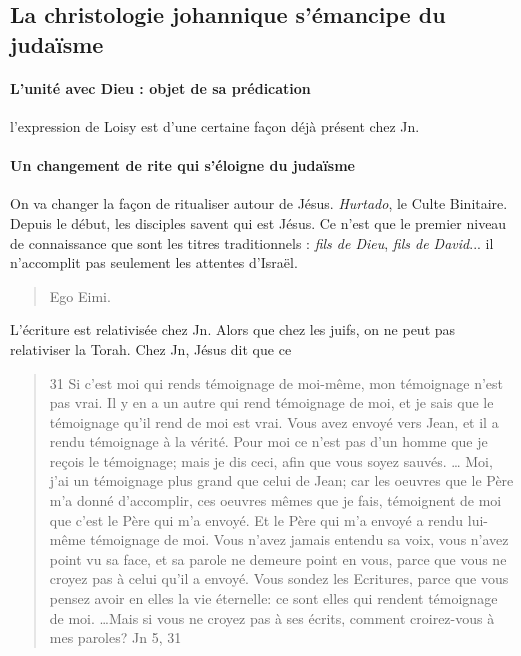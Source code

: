    
     
    \subsection{La christologie johannique s'émancipe du judaïsme}
     
        \paragraph{L'unité avec Dieu : objet de sa prédication} l'expression de Loisy est d'une certaine façon déjà présent chez Jn.
    \paragraph{Un changement de rite qui s'éloigne du judaïsme} On va changer la façon de ritualiser autour de Jésus. \textit{Hurtado}, le Culte Binitaire.
    Depuis le début, les disciples savent qui est Jésus. Ce n'est que le premier niveau de connaissance que sont les titres traditionnels : \textit{fils de Dieu}, \textit{fils de David}... il n'accomplit pas seulement les attentes d'Israël.
 
\begin{quote}
    Ego Eimi.
\end{quote}
L'écriture est relativisée chez Jn. Alors que chez les juifs, on ne peut pas relativiser la Torah.
Chez Jn, Jésus dit que ce 
\begin{quote}
31 Si c'est moi qui rends témoignage de moi-même, mon témoignage n'est pas vrai. Il y en a un autre qui rend témoignage de moi, et je sais que le témoignage qu'il rend de moi est vrai.
Vous avez envoyé vers Jean, et il a rendu témoignage à la vérité. Pour moi ce n'est pas d'un homme que je reçois le témoignage; mais je dis ceci, afin que vous soyez sauvés. \ldots
Moi, j'ai un témoignage plus grand que celui de Jean; car les oeuvres que le Père m'a donné d'accomplir, ces oeuvres mêmes que je fais, témoignent de moi que c'est le Père qui m'a envoyé.
Et le Père qui m'a envoyé a rendu lui-même témoignage de moi. Vous n'avez jamais entendu sa voix, vous n'avez point vu sa face, et sa parole ne demeure point en vous, parce que vous ne croyez pas à celui qu'il a envoyé.
Vous sondez les Ecritures, parce que vous pensez avoir en elles la vie éternelle: ce sont elles qui rendent témoignage de moi. \ldots Mais si vous ne croyez pas à ses écrits, comment croirez-vous à mes paroles?
    Jn 5, 31
\end{quote}
 
